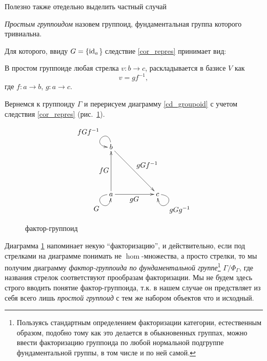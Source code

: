     Полезно также отедельно выделить частный случай

    \begin{definition}
        \emph{Простым группоидом} назовем группоид, фундаментальная группа 
        которого тривиальна.
    \end{definition}

    Для которого, ввиду $G = \{\operatorname*{id}_a$\} следствие \ref{cor_repres} принимает вид:

    \begin{corollary}
        В простом группоиде любая стрелка $v : b \to c$, раскладывается в 
        базисе $V$ как
        \[v = gf^{-1},\]
        где $f : a \to b$, $g : a \to c$.
    \end{corollary}

    \bigskip

    Вернемся к группоиду $\Gamma$ и перерисуем диаграмму \ref{cd_groupoid} с 
    учетом следствия \ref{cor_repres} (рис.~\ref{cd_groupoid_repres}).

    \bigskip
    
    \begin{figure}[h]
        \centering
        \[\xymatrix{
            b \ar@(u,l)[]_{\textstyle fGf^{-1}} \ar[ddrr]^{\textstyle gGf^{-1}}             & &                             \\
                                                                                            & &                             \\
            a \ar@(l,d)[]_{\textstyle G} \ar[uu]^{\textstyle fG} \ar[rr]_{\textstyle gG}    & & c \ar@(r,d)[]^{\textstyle gGg^{-1}}
        }\]
        \caption{фактор-группоид}
        \label{cd_groupoid_repres}
    \end{figure}

    Диаграмма \ref{cd_groupoid_repres} напоминает некую ``факторизацию'', и 
    действительно, если под стрелками на диаграмме понимать не $\hom$-множества,
    а просто стрелки, то мы получим диаграмму \emph{фактор-группоида по 
    фундаментальной группе}\footnote{Пользуясь стандартным 
    определением факторизации категории\cite{MacLane}, естественным
    образом, подобно тому как это делается в обыкновенных группах, можно ввести 
    факторизацию группоида по любой нормальной подгруппе фундаментальной 
    группы, в том числе и по ней самой.} $\Gamma/\Phi_\Gamma$, 
    где названия стрелок соответствуют прообразам 
    факторизации. Мы не будем здесь строго вводить понятие фактор-группоида, 
    т.к. в нашем случае он предствляет из себя всего лишь \emph{простой 
    группоид} с тем же набором объектов что и исходный.


